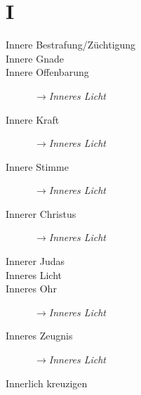 \section*{I}

\articlesize

\begin{description}
 \item[Innere Bestrafung/Züchtigung]
 \item[Innere Gnade]
 \item[Innere Offenbarung] $\to$\textit{Inneres Licht}
 \item[Innere Kraft] $\to$\textit{Inneres Licht}
 \item[Innere Stimme] $\to$\textit{Inneres Licht}
 \item[Innerer Christus] $\to$\textit{Inneres Licht}
 \item[Innerer Judas]
 \item[Inneres Licht]
 \item[Inneres Ohr] $\to$\textit{Inneres Licht}
 \item[Inneres Zeugnis] $\to$\textit{Inneres Licht}
 \item[Innerlich kreuzigen]
 \end{description}

\normalsize